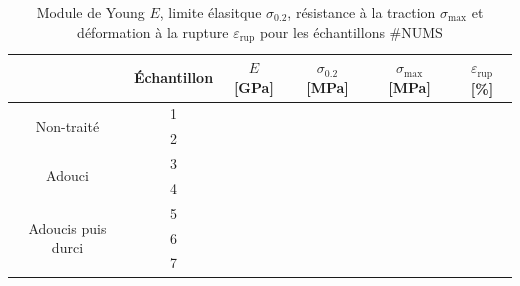 \begin{table}[h]
    \centering
    \begin{tabular}{ |c||c|c|c|c|c| }
        \cline{2-6}
        \multicolumn{1}{c|}{} & Échantillon & \(E\) [GPa] & \(\sigma_{0.2}\) [MPa] & \(\sigma_{\textrm{max}}\) [MPa] & \(\varepsilon_{\textrm{rup}}\) [\%] \\
        \hline
        \multirow{2}{4cm}{Non-traité} & 1 &  &  &  &  \\
        & 2 &  &  &  &  \\
        \hline
        \multirow{2}{4cm}{Adouci} & 3 &  &  &  &  \\
        & 4 &  &  &  &  \\
        \hline
        \multirow{3}{4cm}{Adoucis puis durci} & 5 &  &  &  &  \\
        & 6 &  &  &  &  \\
        & 7 &  &  &  &  \\
        \hline
    \end{tabular}
    \caption{Module de Young \(E\), limite élasitque \(\sigma_{0.2}\), résistance à la traction \(\sigma_{\textrm{max}}\) et déformation à la rupture \(\varepsilon_{\textrm{rup}}\) pour les échantillons \#NUMS}
    \label{tab:results}
\end{table}



